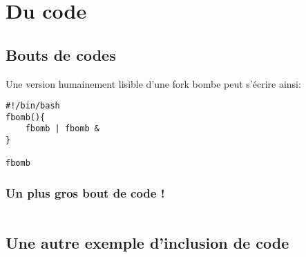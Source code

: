 \section{Du code}
\subsection{Bouts de codes}
Une version humainement lisible d'une fork bombe peut s'écrire ainsi:
\begin{verbatim}
#!/bin/bash
fbomb(){
    fbomb | fbomb &
}

fbomb
\end{verbatim}

\subsubsection{Un plus gros bout de code !}
\inputminted{python}{src/parts/code/example.py}
\newpage

\subsection{Une autre exemple d'inclusion de code}
\inputminted{python}{src/parts/code/example2.py}

    
    